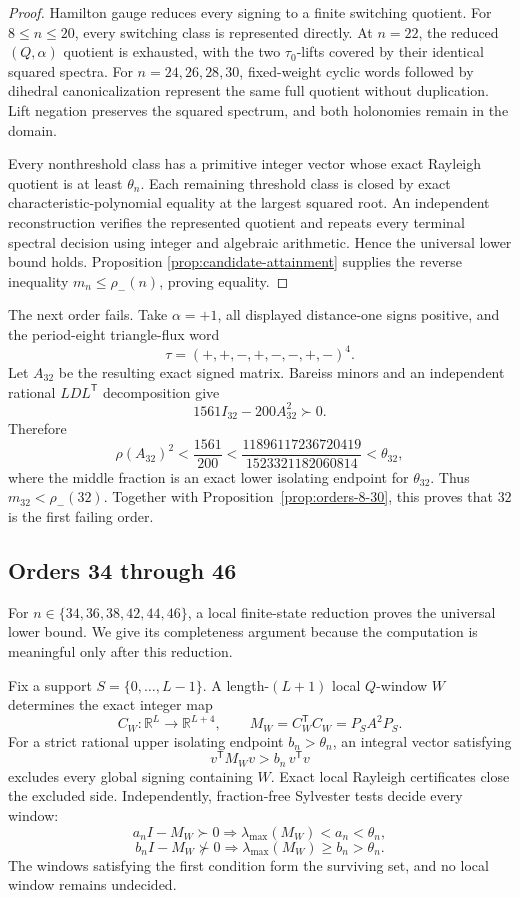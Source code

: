 \begin{proof}
Hamilton gauge reduces every signing to a finite switching quotient.  For
\(8\leq n\leq20\), every switching class is represented directly.  At
\(n=22\), the reduced \((Q,\alpha)\) quotient is exhausted, with the two
\(\tau_0\)-lifts covered by their identical squared spectra.  For
\(n=24,26,28,30\), fixed-weight cyclic words followed by dihedral
canonicalization represent the same full quotient without duplication.
Lift negation preserves the squared spectrum, and both holonomies remain in
the domain.

Every nonthreshold class has a primitive integer vector whose exact Rayleigh
quotient is at least \(\theta_n\).  Each remaining threshold class is closed
by exact characteristic-polynomial equality at the largest squared root.
An independent reconstruction verifies the represented quotient and repeats
every terminal spectral decision using integer and algebraic arithmetic.
Hence the universal lower bound holds.  Proposition
\ref{prop:candidate-attainment} supplies the reverse inequality
\(m_n\leq\rho_-(n)\), proving equality.
\end{proof}

The next order fails.  Take \(\alpha=+1\), all displayed distance-one signs
positive, and the period-eight triangle-flux word
\[
\tau=(+,+,-,+,-,-,+,-)^4.
\]
Let \(A_{32}\) be the resulting exact signed matrix.  Bareiss minors and an
independent rational \(LDL^{\mathsf T}\) decomposition give
\[
1561I_{32}-200A_{32}^2\succ0.
\]
Therefore
\[
\rho(A_{32})^2<\frac{1561}{200}
<\frac{11896117236720419}{1523321182060814}
<\theta_{32},
\]
where the middle fraction is an exact lower isolating endpoint for
\(\theta_{32}\).  Thus \(m_{32}<\rho_-(32)\).  Together with
Proposition~\ref{prop:orders-8-30}, this proves that \(32\) is the first
failing order.

\subsection{Orders 34 through 46}
\label{subsec:orders-34-46}

For \(n\in\{34,36,38,42,44,46\}\), a local finite-state reduction proves the
universal lower bound.  We give its completeness argument because the
computation is meaningful only after this reduction.

Fix a support \(S=\{0,\ldots,L-1\}\).  A length-\((L+1)\) local \(Q\)-window
\(W\) determines the exact integer map
\[
C_W:\mathbb R^L\longrightarrow\mathbb R^{L+4},
\qquad
M_W=C_W^{\mathsf T}C_W=P_SA^2P_S.
\]
For a strict rational upper isolating endpoint \(b_n>\theta_n\), an integral
vector satisfying
\[
v^{\mathsf T}M_Wv>b_n\,v^{\mathsf T}v
\]
excludes every global signing containing \(W\).  Exact local Rayleigh
certificates close the excluded side.  Independently, fraction-free
Sylvester tests decide every window:
\[
a_nI-M_W\succ0\Longrightarrow\lambda_{\max}(M_W)<a_n<\theta_n,
\]
\[
b_nI-M_W\not\succ0\Longrightarrow
\lambda_{\max}(M_W)\geq b_n>\theta_n.
\]
The windows satisfying the first condition form the surviving set, and no
local window remains undecided.

